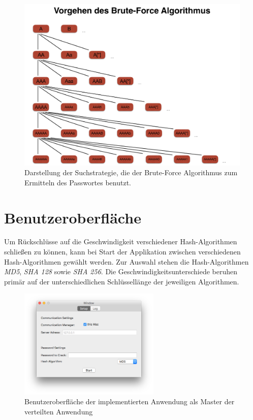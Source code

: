 \begin{figure}[!ht]
	\centering
		\includegraphics[natwidth=1200pt, natheight=349pt, width=1.0\textwidth]{images/SchaubildAlgorithmBreitensuche.pdf}
	\caption{Darstellung der Suchstrategie, die der Brute-Force Algorithmus zum Ermitteln des Passwortes benutzt.}
	\label{fig:showcase}
\end{figure}


\section{Benutzeroberfläche}

Um Rückschlüsse auf die Geschwindigkeit verschiedener Hash-Algorithmen schließen zu können, kann bei Start der Applikation zwischen verschiedenen Hash-Algorithmen gewählt werden. Zur Auswahl stehen die Hash-Algorithmen \emph{MD5}, \emph{SHA 128} sowie \emph{SHA 256}. Die Geschwindigkeitsunterschiede beruhen primär auf der unterschiedlichen Schlüssellänge der jeweiligen Algorithmen.

\begin{figure}[!ht]
	\centering
		\includegraphics[natwidth=1200pt, natheight=349pt, width=0.6\textwidth]{images/WindowMaster.png}
		\caption{Benutzeroberfläche der implementierten Anwendung als Master der verteilten Anwendung}
	\label{fig:WindowMaster}
\end{figure}



